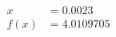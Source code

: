 \documentclass[preview]{standalone}
\begin{document}
\begin{align*}
x &= 0.0023\\f(x) &= 4.0109705
\end{align*}
\end{document}
